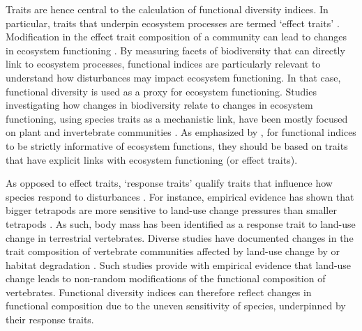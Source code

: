 Traits are hence central to the calculation of functional diversity indices. In particular, traits that underpin ecosystem processes are termed `effect traits' \citep{Lavorel2002}. Modification in the effect trait composition of a community can lead to changes in ecosystem functioning \citep{Seguin2014, DeBello2010}. By measuring facets of biodiversity that can directly link to ecosystem processes, functional indices are particularly relevant to understand how disturbances may impact ecosystem functioning. In that case, functional diversity is used as a proxy for ecosystem functioning. Studies investigating how changes in biodiversity relate to changes in ecosystem functioning, using species traits as a mechanistic link, have been mostly focused on plant and invertebrate communities \citep{Hevia2017}. As emphasized by \citet{Cadotte2011}, for functional indices to be strictly informative of ecosystem functions, they should be based on traits that have explicit links with ecosystem functioning (or effect traits).

As opposed to effect traits, `response traits' qualify traits that influence how species respond to disturbances \citep{Lavorel2002}. For instance, empirical evidence has shown that bigger tetrapods are more sensitive to land-use change pressures than smaller tetrapods \citep{Rapacciuolo2017}. As such, body mass has been identified as a response trait to land-use change in terrestrial vertebrates. Diverse studies have documented changes in the trait composition of vertebrate communities affected by land-use change by or habitat degradation \citep{Newbold2014, Colin2018, LaSorte2018, Flynn2009, Tinoco2018}. Such studies provide with empirical evidence that land-use change leads to non-random modifications of the functional composition of vertebrates. Functional diversity indices can therefore reflect changes in functional composition due to the uneven sensitivity of species, underpinned by their response traits. 

